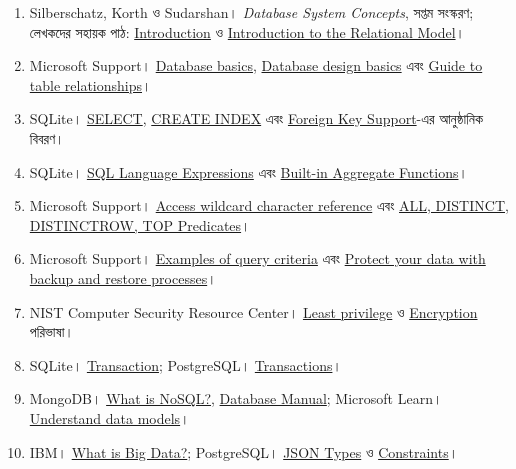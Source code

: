 \begin{enumerate}
\item Silberschatz, Korth ও Sudarshan। \textit{Database System Concepts}, সপ্তম সংস্করণ; লেখকদের সহায়ক পাঠ: \href{https://www.db-book.com/slides-dir/PDF-dir/ch1.pdf}{Introduction} ও \href{https://www.db-book.com/slides-dir/PDF-dir/ch2.pdf}{Introduction to the Relational Model}।
\item Microsoft Support। \href{https://support.microsoft.com/en-us/access/database-basics}{Database basics}, \href{https://support.microsoft.com/en-us/access/database-design-basics}{Database design basics} এবং \href{https://support.microsoft.com/en-us/access/guide-to-table-relationships}{Guide to table relationships}।
\item SQLite। \href{https://www.sqlite.org/lang_select.html}{SELECT}, \href{https://www.sqlite.org/lang_createindex.html}{CREATE INDEX} এবং \href{https://www.sqlite.org/foreignkeys.html}{Foreign Key Support}-এর আনুষ্ঠানিক বিবরণ।
\item SQLite। \href{https://www.sqlite.org/lang_expr.html}{SQL Language Expressions} এবং \href{https://www.sqlite.org/lang_aggfunc.html}{Built-in Aggregate Functions}।
\item Microsoft Support। \href{https://support.microsoft.com/en-us/access/access-wildcard-character-reference}{Access wildcard character reference} এবং \href{https://support.microsoft.com/en-au/access/all-distinct-distinctrow-top-predicates}{ALL, DISTINCT, DISTINCTROW, TOP Predicates}।
\item Microsoft Support। \href{https://support.microsoft.com/en-us/access/examples-of-query-criteria}{Examples of query criteria} এবং \href{https://support.microsoft.com/en-us/access/protect-your-data-with-backup-and-restore-processes}{Protect your data with backup and restore processes}।
\item NIST Computer Security Resource Center। \href{https://csrc.nist.gov/glossary/term/least_privilege}{Least privilege} ও \href{https://csrc.nist.gov/glossary/term/encryption}{Encryption} পরিভাষা।
\item SQLite। \href{https://www.sqlite.org/lang_transaction.html}{Transaction}; PostgreSQL। \href{https://www.postgresql.org/docs/18/tutorial-transactions.html}{Transactions}।
\item MongoDB। \href{https://www.mongodb.com/resources/basics/databases/nosql-explained}{What is NoSQL?}, \href{https://www.mongodb.com/docs/manual/}{Database Manual}; Microsoft Learn। \href{https://learn.microsoft.com/en-us/azure/architecture/guide/technology-choices/data-store-overview}{Understand data models}।
\item IBM। \href{https://www.ibm.com/think/topics/big-data}{What is Big Data?}; PostgreSQL। \href{https://www.postgresql.org/docs/18/datatype-json.html}{JSON Types} ও \href{https://www.postgresql.org/docs/18/ddl-constraints.html}{Constraints}।


\end{enumerate}

